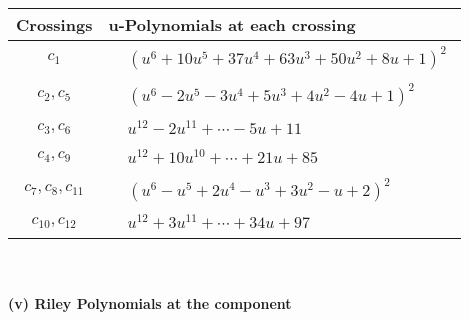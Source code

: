 \documentclass[1p]{elsarticle_modified}
\theoremstyle{definition}
\begin{document}
\begin{tabular}{m{50pt}|m{274pt}}
Crossings & \hspace{64pt}u-Polynomials at each crossing \\
\hline $$\begin{aligned}c_{1}\end{aligned}$$&$\begin{aligned}
&(u^6+10 u^5+37 u^4+63 u^3+50 u^2+8 u+1)^2
\end{aligned}$\\
\hline $$\begin{aligned}c_{2},c_{5}\end{aligned}$$&$\begin{aligned}
&(u^6-2 u^5-3 u^4+5 u^3+4 u^2-4 u+1)^2
\end{aligned}$\\
\hline $$\begin{aligned}c_{3},c_{6}\end{aligned}$$&$\begin{aligned}
&u^{12}-2 u^{11}+\cdots-5 u+11
\end{aligned}$\\
\hline $$\begin{aligned}c_{4},c_{9}\end{aligned}$$&$\begin{aligned}
&u^{12}+10 u^{10}+\cdots+21 u+85
\end{aligned}$\\
\hline $$\begin{aligned}c_{7},c_{8},c_{11}\end{aligned}$$&$\begin{aligned}
&(u^6- u^5+2 u^4- u^3+3 u^2- u+2)^2
\end{aligned}$\\
\hline $$\begin{aligned}c_{10},c_{12}\end{aligned}$$&$\begin{aligned}
&u^{12}+3 u^{11}+\cdots+34 u+97
\end{aligned}$\\
\hline
\end{tabular}\\~\\
\newpage\renewcommand{\arraystretch}{1}
\flushleft \textbf{(v) Riley Polynomials at the component}\newline \\
\end{document}
